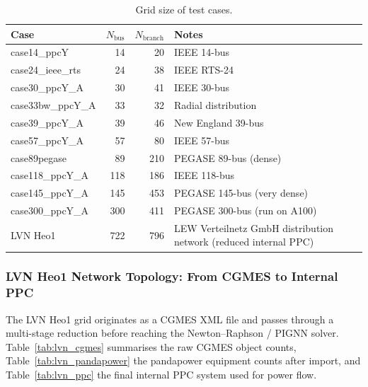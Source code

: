 \documentclass{article}
\begin{document}
\begin{table}[h]
\centering
\caption{Grid size of test cases.}
\label{tab:grid_size}
\begin{tabular}{lrrl}
\toprule
Case & $N_{\mathrm{bus}}$ & $N_{\mathrm{branch}}$ & Notes \\
\midrule
case14\_ppcY          & 14  & 20  & IEEE 14-bus \\
case24\_ieee\_rts     & 24  & 38  & IEEE RTS-24 \\
case30\_ppcY\_A       & 30  & 41  & IEEE 30-bus \\
case33bw\_ppcY\_A     & 33  & 32  & Radial distribution \\
case39\_ppcY\_A       & 39  & 46  & New England 39-bus \\
case57\_ppcY\_A       & 57  & 80  & IEEE 57-bus \\
case89pegase          & 89  & 210 & PEGASE 89-bus (dense) \\
case118\_ppcY\_A      & 118 & 186 & IEEE 118-bus \\
case145\_ppcY\_A      & 145 & 453 & PEGASE 145-bus (very dense) \\
case300\_ppcY\_A      & 300 & 411 & PEGASE 300-bus (run on A100) \\
LVN Heo1              & 722 & 796 & LEW Verteilnetz GmbH distribution network (reduced internal PPC) \\
\bottomrule
\end{tabular}
\end{table}

\subsubsection*{LVN Heo1 Network Topology: From CGMES to Internal PPC}
\label{subsec:lvn_topology}

The LVN Heo1 grid originates as a CGMES XML file and passes through a
multi-stage reduction before reaching the Newton--Raphson / PIGNN solver.
Table~\ref{tab:lvn_cgmes} summarises the raw CGMES object counts,
Table~\ref{tab:lvn_pandapower} the pandapower equipment counts after import,
and Table~\ref{tab:lvn_ppc} the final internal PPC system used for power
flow.
\end{document}
